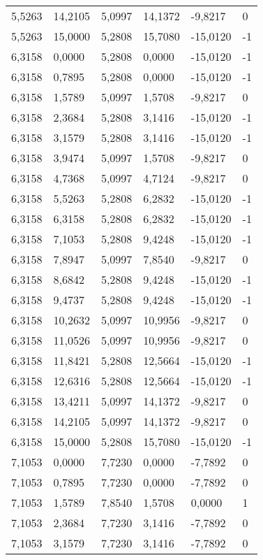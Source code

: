 \begin{longtable}{@{}llllll@{}}
		5,5263  & 14,2105 & 5,0997  & 14,1372 & -9,8217  & 0  \\
		5,5263  & 15,0000 & 5,2808  & 15,7080 & -15,0120 & -1 \\
		6,3158  & 0,0000  & 5,2808  & 0,0000  & -15,0120 & -1 \\
		6,3158  & 0,7895  & 5,2808  & 0,0000  & -15,0120 & -1 \\
		6,3158  & 1,5789  & 5,0997  & 1,5708  & -9,8217  & 0  \\
		6,3158  & 2,3684  & 5,2808  & 3,1416  & -15,0120 & -1 \\
		6,3158  & 3,1579  & 5,2808  & 3,1416  & -15,0120 & -1 \\
		6,3158  & 3,9474  & 5,0997  & 1,5708  & -9,8217  & 0  \\
		6,3158  & 4,7368  & 5,0997  & 4,7124  & -9,8217  & 0  \\
		6,3158  & 5,5263  & 5,2808  & 6,2832  & -15,0120 & -1 \\
		6,3158  & 6,3158  & 5,2808  & 6,2832  & -15,0120 & -1 \\
		6,3158  & 7,1053  & 5,2808  & 9,4248  & -15,0120 & -1 \\
		6,3158  & 7,8947  & 5,0997  & 7,8540  & -9,8217  & 0  \\
		6,3158  & 8,6842  & 5,2808  & 9,4248  & -15,0120 & -1 \\
		6,3158  & 9,4737  & 5,2808  & 9,4248  & -15,0120 & -1 \\
		6,3158  & 10,2632 & 5,0997  & 10,9956 & -9,8217  & 0  \\
		6,3158  & 11,0526 & 5,0997  & 10,9956 & -9,8217  & 0  \\
		6,3158  & 11,8421 & 5,2808  & 12,5664 & -15,0120 & -1 \\
		6,3158  & 12,6316 & 5,2808  & 12,5664 & -15,0120 & -1 \\
		6,3158  & 13,4211 & 5,0997  & 14,1372 & -9,8217  & 0  \\
		6,3158  & 14,2105 & 5,0997  & 14,1372 & -9,8217  & 0  \\
		6,3158  & 15,0000 & 5,2808  & 15,7080 & -15,0120 & -1 \\
		7,1053  & 0,0000  & 7,7230  & 0,0000  & -7,7892  & 0  \\
		7,1053  & 0,7895  & 7,7230  & 0,0000  & -7,7892  & 0  \\
		7,1053  & 1,5789  & 7,8540  & 1,5708  & 0,0000   & 1  \\
		7,1053  & 2,3684  & 7,7230  & 3,1416  & -7,7892  & 0  \\
		7,1053  & 3,1579  & 7,7230  & 3,1416  & -7,7892  & 0  \\

\end{longtable}
